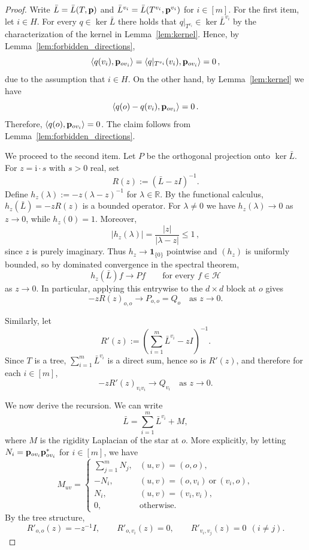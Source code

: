 \documentclass[10pt,a4paper]{amsart}
\numberwithin{equation}{section}
\newcommand{\R}{\mathbb R}
\newcommand{\cH}{\mathcal H}
\newcommand{\ii}{\mathrm{i}}
\newcommand{\p}{{\bf p}}
\begin{document}
\begin{proof}
Write $\bar L=\bar L(T,\p)$ and $\bar L^{v_i}=\bar L(T^{v_i},\p^{v_i})$ for $i\in[m]$.
For the first item, let $i\in H$. For every $q\in\ker\bar L$ there holds that $q|_{T^{v_i}}\in\ker \bar L^{v_i}$ by
the characterization of the kernel in Lemma~\ref{lem:kernel}. Hence, by Lemma~\ref{lem:forbidden_directions},
\[
\langle q(v_i),\p_{ov_i}\rangle=\langle q|_{T^{v_i}}(v_i),\p_{ov_i}\rangle=0\,,
\]
due to the assumption that $i\in H$. On the other hand, by Lemma~\ref{lem:kernel} we have
\[
\langle q(o)-q(v_i),\p_{ov_i}\rangle=0\,.
\]
Therefore, $\langle q(o),\p_{ov_i}\rangle=0$. The claim follows from Lemma~\ref{lem:forbidden_directions}.

We proceed to the second item. Let $P$ be the orthogonal projection onto $\ker\bar L$.
For $z=\ii\cdot s$ with $s>0$ real, set
\[
R(z):=(\bar L-zI)^{-1}.
\]
Define $h_z(\lambda):=-z(\lambda-z)^{-1}$ for $\lambda\in\R$. By the functional calculus,
$h_z(\bar L)=-zR(z)$ is a bounded operator. For $\lambda\neq 0$ we have $h_z(\lambda)\to 0$ as $z\to 0$, while $h_z(0)=1$.
Moreover,
\[
|h_z(\lambda)|=\frac{|z|}{|\lambda-z|}\le 1\,,
\]
since $z$ is purely imaginary. Thus $h_z\to \mathbf 1_{\{0\}}$ pointwise and $(h_z)$ is uniformly bounded, so by dominated
convergence in the spectral theorem,
\[
h_z(\bar L)f\to Pf\qquad\text{for every }f\in\cH
\]
as $z\to 0$. In particular, applying this entrywise to the $d\times d$ block at $o$ gives
\[
-zR(z)_{o,o}\to P_{o,o}=Q_o\quad \mbox{as }z\to 0.
\]

Similarly, let
\[
R'(z):=\left(\sum_{i=1}^m \bar L^{v_i}-zI\right)^{-1}.
\]
Since $T$ is a tree, $\sum_{i=1}^m\bar L^{v_i}$ is a direct sum, hence so is $R'(z)$, and therefore for each $i\in[m]$,
\[
-zR'(z)_{v_iv_i}\to Q_{v_i}
\quad \mbox{as }z\to 0.
\]

We now derive the recursion. We can write
\[
\bar L=\sum_{i=1}^m \bar L^{v_i}+M,
\]
where $M$ is the rigidity Laplacian of the star at $o$. 
More explicitly, by letting $N_i=\p_{ov_i}\p_{ov_i}^*$ for $i\in [m]$, we have
\[
M_{uv}=
\begin{cases}
\sum_{j=1}^m N_j, & (u,v)=(o,o),\\
-N_i, & (u,v)=(o,v_i)\ \text{or}\ (v_i,o),\\
N_i, & (u,v)=(v_i,v_i),\\
0, & \text{otherwise}.
\end{cases}
\]
By the tree structure,
\begin{equation}\label{eq:Rprime_blocks}
R'_{o,o}(z)=-z^{-1}I,\qquad R'_{o,v_i}(z)=0,\qquad R'_{v_i,v_j}(z)=0\ \ (i\neq j).
\end{equation}


\end{proof}
\end{document}
